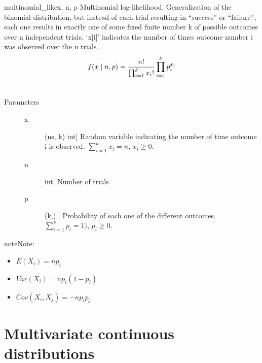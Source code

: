 \hypertarget{pymc.distributions.multinomial_like}{}\begin{funcdesc}{multinomial\_like}{x, n, p}
Multinomial log-likelihood. Generalization of the binomial
distribution, but instead of each trial resulting in ``success'' or
``failure'', each one results in exactly one of some fixed finite number k
of possible outcomes over n independent trials. `x{[}i{]}' indicates the number
of times outcome number i was observed over the n trials.
\begin{gather}
\begin{split}f(x \mid n, p) = \frac{n!}{\prod_{i=1}^k x_i!} \prod_{i=1}^k p_i^{x_i}\end{split}\notag\\\begin{split}\end{split}\notag
\end{gather}\begin{description}
\item[Parameters] \leavevmode\begin{description}
\item[x] \leavevmode{[}(ns, k) int{]}
Random variable indicating the number of time outcome i is
observed. $\sum_{i=1}^k x_i=n$, $x_i \ge 0$.

\item[n] \leavevmode{[}int{]}
Number of trials.

\item[p] \leavevmode{[}(k,) {]}
Probability of each one of the different outcomes.
$\sum_{i=1}^k p_i = 1)$, $p_i \ge 0$.

\end{description}

\end{description}

\begin{notice}{note}{Note:}\begin{itemize}
\item {}
$E(X_i)=n p_i$

\item {}
$Var(X_i)=n p_i(1-p_i)$

\item {}
$Cov(X_i,X_j) = -n p_i p_j$

\end{itemize}
\end{notice}
\end{funcdesc}


\section{Multivariate continuous distributions}

